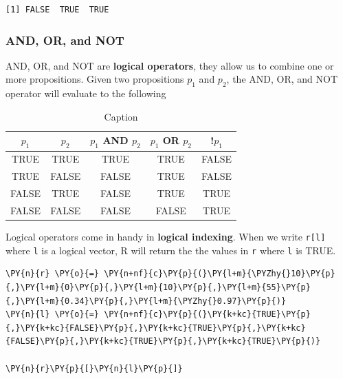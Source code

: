     \begin{Verbatim}[commandchars=\\\{\}]
[1] FALSE  TRUE  TRUE
    \end{Verbatim}

    \hypertarget{and-or-and-not}{%
\subsubsection{AND, OR, and NOT}\label{and-or-and-not}}

AND, OR, and NOT are \textbf{logical operators}, they allow us to
combine one or more propositions. Given two propositions \(p_{1}\) and
\(p_{2}\), the AND, OR, and NOT operator will evaluate to the following


\begin{table}[ht!]
    \centering
    \begin{tabular}{ccccc}
        \hline
        $p_{1}$ &$p_{2}$ &$p_{1}$ AND $p_{2}$ &$p_{1}$ OR $p_{2}$ &!$p_{1}$\\
        \hline \vspace{1mm}
        TRUE & TRUE & TRUE & TRUE & FALSE \\
        TRUE & FALSE & FALSE & TRUE & FALSE \\
        FALSE & TRUE & FALSE & TRUE & TRUE \\
        FALSE & FALSE & FALSE & FALSE & TRUE \\
    \hline
    \end{tabular}
    \caption{Caption}
    \label{tab:my_label}
\end{table}


Logical operators come in handy in \textbf{logical indexing}. When we
write \texttt{r{[}l{]}} where \texttt{l} is a logical vector, R will
return the the values in \texttt{r} where \texttt{l} is TRUE.

    \begin{tcolorbox}[breakable, size=fbox, boxrule=1pt, pad at break*=1mm,colback=cellbackground, colframe=cellborder]
\begin{Verbatim}[commandchars=\\\{\}]
\PY{n}{r} \PY{o}{=} \PY{n+nf}{c}\PY{p}{(}\PY{l+m}{\PYZhy{}10}\PY{p}{,}\PY{l+m}{0}\PY{p}{,}\PY{l+m}{10}\PY{p}{,}\PY{l+m}{55}\PY{p}{,}\PY{l+m}{0.34}\PY{p}{,}\PY{l+m}{\PYZhy{}0.97}\PY{p}{)}
\PY{n}{l} \PY{o}{=} \PY{n+nf}{c}\PY{p}{(}\PY{k+kc}{TRUE}\PY{p}{,}\PY{k+kc}{FALSE}\PY{p}{,}\PY{k+kc}{TRUE}\PY{p}{,}\PY{k+kc}{FALSE}\PY{p}{,}\PY{k+kc}{TRUE}\PY{p}{,}\PY{k+kc}{TRUE}\PY{p}{)}

\PY{n}{r}\PY{p}{[}\PY{n}{l}\PY{p}{]}
\end{Verbatim}
\end{tcolorbox}

